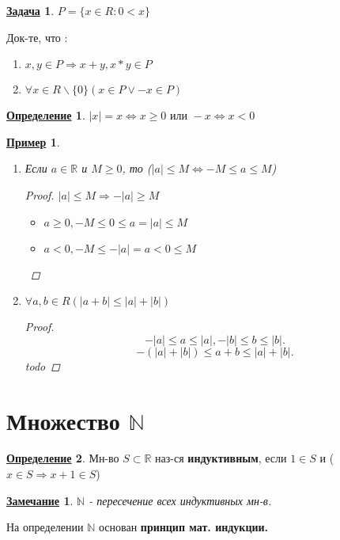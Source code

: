 \documentclass[12pt]{article}
\newcommand{\R}{\mathbb{R}}
\newcommand{\N}{\mathbb{N}}
\newtheorem*{note}{\underline{Замечание}}
\newtheorem*{example}{\underline{Пример}}
\theoremstyle{definition}
\newtheorem{definition}{\underline{Определение}}[section]
\theoremstyle{definition}
\newtheorem{task}{\underline{Задача}}[section]
\begin{document}
\begin{task}
$P = \{x  \in  R \colon  0 < x\}$

Док-те, что  :
\begin{enumerate}
    \item [1) ] $x, y  \in P \Rightarrow x + y, x * y  \in P$
    \item [2) ] $\forall x  \in R \backslash \{0\} (x  \in P  \lor -x \in P)$
\end{enumerate}
\end{task}

\begin{definition}
$|x| = x \iff x \geq 0 \text{ или } -x \iff x < 0$
\end{definition}
\begin{example}
\begin{enumerate}
    \item Если $a  \in \R $ и $M \geq 0$, то ($|a| \leq M \iff -M \leq a \leq M$)
        \begin{proof}
        $|a| \leq M \Rightarrow -|a| \geq M$
        \begin{itemize}
            \item [a) ] $a \geq 0, -M \leq 0 \leq a = |a| \leq M$ 
            \item [b) ] $a < 0, -M \leq -|a| = a < 0 \leq M$
        \end{itemize}
        \end{proof}
    \item $\forall a, b \in R (|a + b| \leq |a| + |b|)$ 
        \begin{proof}
       \[
       -|a| \leq a \leq |a|, -|b| \leq b \leq |b|
       .\]  
       \[
       -(|a| + |b|) \leq a + b \leq |a| + |b|
       .\] 
       todo
        \end{proof}
        
\end{enumerate}
\end{example}
\section{Множество $\N$}

\begin{definition}
Мн-во $S \subset \R$ наз-ся \textbf{индуктивным}, если $1  \in S$ и ($x \in S \Rightarrow x + 1 \in S$)
\end{definition}
\begin{note}
$\N$ - пересечение всех индуктивных мн-в.
\end{note}
На определении $\N$ основан \textbf{принцип мат. индукции.}
\end{document}
